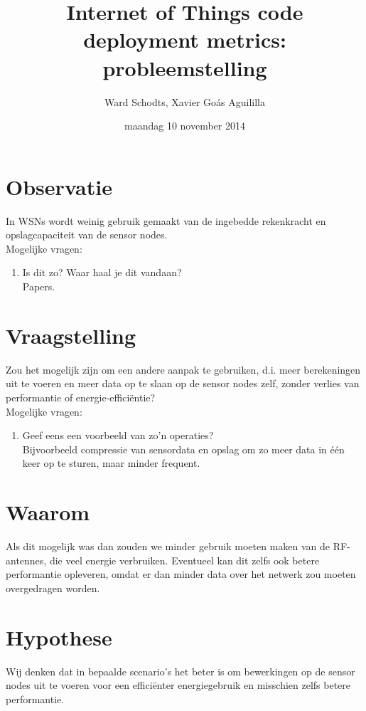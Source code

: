 \documentclass[11pt]{article}
\author{Ward Schodts, Xavier Goás Aguililla}
\date{maandag 10 november 2014}
\title{Internet of Things code deployment metrics: probleemstelling}
\begin{document}
\maketitle

\section{Observatie}
\label{sec-1}
In WSNs wordt weinig gebruik gemaakt van de ingebedde rekenkracht en
opslagcapaciteit van de sensor nodes.\\

Mogelijke vragen: 

\begin{enumerate}
\item Is dit zo? Waar haal je dit vandaan?\\
   Papers.
\end{enumerate}
\section{Vraagstelling}
\label{sec-2}
Zou het mogelijk zijn om een andere aanpak te gebruiken, d.i. meer
berekeningen uit te voeren en meer data op te slaan op de sensor nodes
zelf, zonder verlies van performantie of energie-efficiëntie?\\

Mogelijke vragen: 

\begin{enumerate}
\item Geef eens een voorbeeld van zo'n operaties?\\
   Bijvoorbeeld compressie van sensordata en opslag om zo meer data in
één keer op te sturen, maar minder frequent.
\end{enumerate}
\section{Waarom}
\label{sec-3}
Als dit mogelijk was dan zouden we minder gebruik moeten maken van de
RF-antennes, die veel energie verbruiken. Eventueel kan dit zelfs ook
betere performantie opleveren, omdat er dan minder data over het
netwerk zou moeten overgedragen worden.
\section{Hypothese}
\label{sec-4}
Wij denken dat in bepaalde scenario's het beter is om bewerkingen op
de sensor nodes uit te voeren voor een efficiënter energiegebruik en
misschien zelfs betere performantie.
\end{document}
